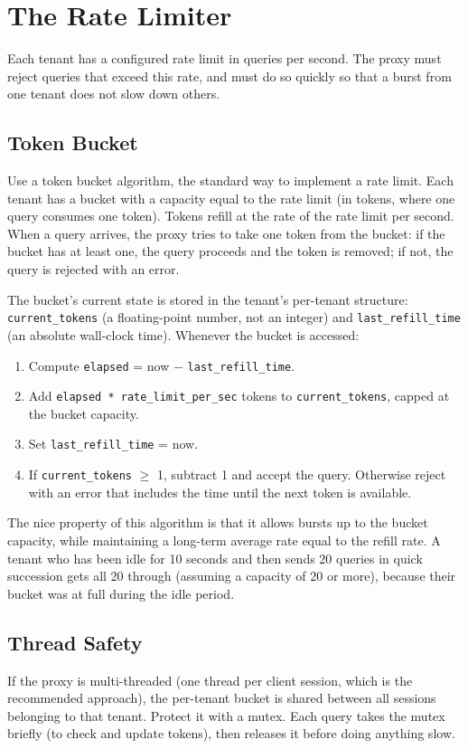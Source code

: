 \documentclass[11pt,a4paper]{article}
\begin{document}
\section{The Rate Limiter}

Each tenant has a configured rate limit in queries per second. The proxy must reject queries that exceed this rate, and must do so quickly so that a burst from one tenant does not slow down others.

\subsection{Token Bucket}
Use a token bucket algorithm, the standard way to implement a rate limit. Each tenant has a bucket with a capacity equal to the rate limit (in tokens, where one query consumes one token). Tokens refill at the rate of the rate limit per second. When a query arrives, the proxy tries to take one token from the bucket: if the bucket has at least one, the query proceeds and the token is removed; if not, the query is rejected with an error.

The bucket's current state is stored in the tenant's per-tenant structure: \texttt{current\_tokens} (a floating-point number, not an integer) and \texttt{last\_refill\_time} (an absolute wall-clock time). Whenever the bucket is accessed:

\begin{enumerate}
\item Compute \texttt{elapsed} = now $-$ \texttt{last\_refill\_time}.
\item Add \texttt{elapsed * rate\_limit\_per\_sec} tokens to \texttt{current\_tokens}, capped at the bucket capacity.
\item Set \texttt{last\_refill\_time} = now.
\item If \texttt{current\_tokens} $\geq$ 1, subtract 1 and accept the query. Otherwise reject with an error that includes the time until the next token is available.
\end{enumerate}

The nice property of this algorithm is that it allows bursts up to the bucket capacity, while maintaining a long-term average rate equal to the refill rate. A tenant who has been idle for 10 seconds and then sends 20 queries in quick succession gets all 20 through (assuming a capacity of 20 or more), because their bucket was at full during the idle period.

\subsection{Thread Safety}
If the proxy is multi-threaded (one thread per client session, which is the recommended approach), the per-tenant bucket is shared between all sessions belonging to that tenant. Protect it with a mutex. Each query takes the mutex briefly (to check and update tokens), then releases it before doing anything slow.
\end{document}
